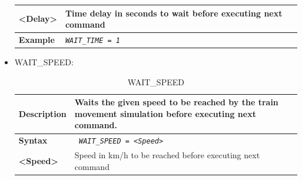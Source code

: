 \documentclass{template/openetcs}
\begin{document}
\begin{itemize}
\begin{longtable}{|l|l|}
			\hline
			
				\begin{minipage}[t]{0.22\linewidth} \textbf{<Delay>} \end{minipage}
			&	\begin{minipage}[t]{0.78\linewidth} Time delay in seconds to wait before executing next command \end{minipage} \\
			
			\hline
				
				\begin{minipage}[t]{0.22\linewidth} \textbf{Example} \end{minipage}
			&	\begin{minipage}[t]{0.78\linewidth}	\emph{\texttt{WAIT\_TIME = 1}} \end{minipage} \\
			
			\hline \hline
			
		\end{longtable}
		
	\item WAIT\_SPEED:
									
		\begin{longtable}{|l|l|}
		\caption{WAIT\_SPEED}\\ 
		
			\hline						
				
				\begin{minipage}[t]{0.22\linewidth} \textbf{Description} \end{minipage} 
			&	\begin{minipage}[t]{0.78\linewidth} Waits the given speed to be reached by the train movement simulation before executing next command. \end{minipage} \\
						
			\hline
									
				\begin{minipage}[t]{0.22\linewidth} \textbf{Syntax}	\end{minipage}
			&	\begin{minipage}[t]{0.78\linewidth} \emph{\texttt{ WAIT\_SPEED = <Speed>}} \end{minipage} \\
			
			\hline
			
				\begin{minipage}[t]{0.22\linewidth} \textbf{<Speed>} \end{minipage}
			&	\begin{minipage}[t]{0.78\linewidth} Speed in km/h to be reached before executing next command \end{minipage} \\
			

\end{longtable}
\end{itemize}
\end{document}
